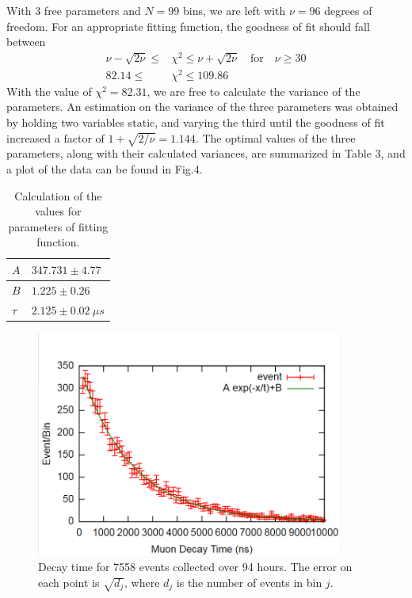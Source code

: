 \documentclass[12pt]{article}
\begin{document}
With $3$ free parameters and $N = 99$ bins, we are left with $\nu = 96$ degrees of freedom. For an appropriate fitting function, the goodness of fit should fall between 
\begin{equation}
\begin{split}
\nu - \sqrt{2\nu} \leq & \chi^2\leq\nu + \sqrt{2\nu} \quad\text{for}\quad\nu\geq 30
\\
82.14 \leq & \chi^2 \leq 109.86
\end{split}
\end{equation}
With the value of $\chi^2 = 82.31$, we are free to calculate the variance of the parameters.  An estimation on the variance of the three parameters was obtained by holding two variables static, and varying the third until the goodness of fit increased a factor of $1+\sqrt{2/\nu} = 1.144$. The optimal values of the three parameters, along with their calculated variances, are summarized in Table 3, and a plot of the data can be found in Fig.4.
\begin{table}[htbp]\centering
\begin{tabular}{ |p{0.5cm}|p{4cm}|}
 \hline
$A$ & \qquad $347.731 \pm 4.77$\\
\hline
 $B$ & \qquad $1.225 \pm 0.26$ \\
 \hline
 $\tau$ & \qquad $2.125 \pm 0.02\:\mu s$\\
 \hline
\end{tabular}
\def\sym#1{\ifmmode^{#1}\else\(^{#1}\)\fi}
\caption{Calculation of the values for parameters of fitting function. }
\end{table}
\begin{figure}[h]
\begin{center}
 \quad \includegraphics[width=0.9\textwidth]{gnuMuonPlot}
\end{center}
\caption{Decay time for 7558 events collected over 94 hours. The error on each point is $\sqrt{d_j}$, where $d_j$ is the number of events in bin $j$.}
\label{fig:lifetime}
\end{figure}
\end{document}
